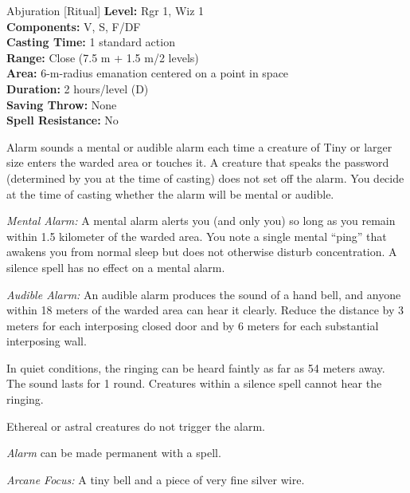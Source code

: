 {Abjuration [Ritual]}
{
	\textbf{Level:}
	Rgr 1, Wiz 1\\
	\textbf{Components:}
	V, S, F/DF\\
	\textbf{Casting Time:}
	1 standard action\\
	\textbf{Range:}
	Close (7.5 m + 1.5 m/2 levels)\\
	\textbf{Area:}
	6-m-radius emanation centered on a point in space\\
	\textbf{Duration:}
	2 hours/level (D)\\
	\textbf{Saving Throw:}
	None\\
	\textbf{Spell Resistance:}
	No\\
}
{
	Alarm sounds a mental or audible alarm each time a creature of Tiny or larger size enters the warded area or touches it. A creature that speaks the password (determined by you at the time of casting) does not set off the alarm. You decide at the time of casting whether the alarm will be mental or audible.

	\textit{Mental Alarm:}
	A mental alarm alerts you (and only you) so long as you remain within 1.5 kilometer of the warded area. You note a single mental ``ping'' that awakens you from normal sleep but does not otherwise disturb concentration. A silence spell has no effect on a mental alarm.

	\textit{Audible Alarm:}
	An audible alarm produces the sound of a hand bell, and anyone within 18 meters of the warded area can hear it clearly. Reduce the distance by 3 meters for each interposing closed door and by 6 meters for each substantial interposing wall.

	In quiet conditions, the ringing can be heard faintly as far as 54 meters away. The sound lasts for 1 round. Creatures within a silence spell cannot hear the ringing.

	Ethereal or astral creatures do not trigger the alarm.

	\emph{Alarm} can be made permanent with a  spell.

	\textit{Arcane Focus:}
	A tiny bell and a piece of very fine silver wire.

}
